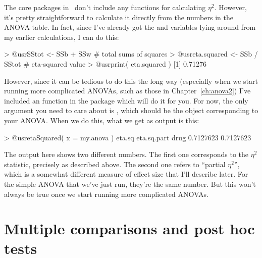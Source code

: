The core packages in \R\ don't include any functions for calculating $\eta^2$. However, it's pretty straightforward to calculate it directly from the numbers in the ANOVA table. In fact, since I've already got the  and  variables lying around from my earlier calculations, I can do this:
\begin{rblock1}
> @usr{SStot <- SSb + SSw}          # total sums of squares
> @usr{eta.squared <- SSb / SStot}  # eta-squared value
> @usr{print( eta.squared )}
[1] 0.71276
\end{rblock1}
However, since it can be tedious to do this the long way (especially when we start running more complicated ANOVAs, such as those in Chapter~\ref{ch:anova2}) I've included an  function in the  package which will do it for you. For now, the only argument you need to care about is , which should be the  object corresponding to your ANOVA. When we do this, what we get as output is this:
\begin{rblock1}
> @usr{etaSquared( x = my.anova )}
        eta.sq eta.sq.part
drug 0.7127623   0.7127623
\end{rblock1}
The output here shows two different numbers. The first one corresponds to the $\eta^2$ statistic, precisely as described above. The second one refers to ``partial $\eta^2$'', which is a somewhat different measure of effect size that I'll describe later. For the simple ANOVA that we've just run, they're the same number. But this won't always be true once we start running more complicated ANOVAs.




\section{Multiple comparisons and post hoc tests~\label{sec:posthoc}}





%
%

